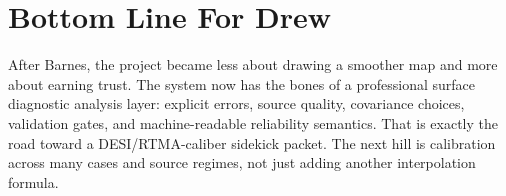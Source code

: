 \documentclass[11pt]{article}
\begin{document}
\section{Bottom Line For Drew}

After Barnes, the project became less about drawing a smoother map and more about
earning trust. The system now has the bones of a professional surface diagnostic
analysis layer: explicit errors, source quality, covariance choices, validation gates,
and machine-readable reliability semantics. That is exactly the road toward a
DESI/RTMA-caliber sidekick packet. The next hill is calibration across many cases and
source regimes, not just adding another interpolation formula.
\end{document}
